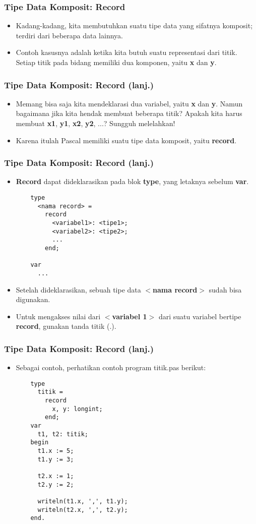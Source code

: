 \begin{frame}
\frametitle{Tipe Data Komposit: Record}
\begin{itemize}
  \item Kadang-kadang, kita membutuhkan suatu tipe data yang sifatnya komposit; terdiri dari beberapa data lainnya.
  \item Contoh kasusnya adalah ketika kita butuh suatu representasi dari titik. Setiap titik pada bidang memiliki dua komponen, yaitu \textbf{x} dan \textbf{y}.
\end{itemize}
\end{frame}

\begin{frame}
\frametitle{Tipe Data Komposit: Record (lanj.)}
\begin{itemize}
  \item Memang bisa saja kita mendeklarasi dua variabel, yaitu \textbf{x} dan \textbf{y}. Namun bagaimana jika kita hendak membuat beberapa titik? Apakah kita harus membuat \textbf{x1}, \textbf{y1}, \textbf{x2}, \textbf{y2}, ...? Sungguh melelahkan!
  \item Karena itulah Pascal memiliki suatu tipe data komposit, yaitu \alert{\textbf{record}}.
\end{itemize}
\end{frame}

\begin{frame}[fragile]
\frametitle{Tipe Data Komposit: Record (lanj.)}
\begin{itemize}
  \item \textbf{Record} dapat dideklarasikan pada blok \textbf{type}, yang letaknya sebelum \textbf{var}.
  \begin{lstlisting}
    type
      <nama record> =
        record
          <variabel1>: <tipe1>;
          <variabel2>: <tipe2>;
          ...
        end;
        
    var
      ...
  \end{lstlisting}
  \item Setelah dideklarasikan, sebuah tipe data \textbf{$<$nama record$>$} sudah bisa digunakan.
  \item Untuk mengakses nilai dari \textbf{$<$variabel 1$>$} dari suatu variabel bertipe \textbf{record}, gunakan tanda titik (.).
\end{itemize}
\end{frame}

\begin{frame}[fragile]
\frametitle{Tipe Data Komposit: Record (lanj.)}
\begin{itemize}
  \item Sebagai contoh, perhatikan contoh program titik.pas berikut:
  \begin{lstlisting}
    type
      titik =
        record
          x, y: longint;
        end;
    var
      t1, t2: titik;
    begin
      t1.x := 5;
      t1.y := 3;

      t2.x := 1;
      t2.y := 2;

      writeln(t1.x, ',', t1.y);
      writeln(t2.x, ',', t2.y);
    end.
  \end{lstlisting}
\end{itemize}
\end{frame}

